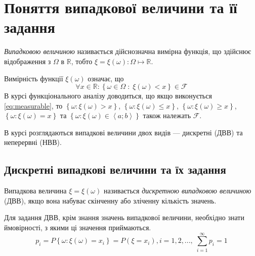 
\section{Поняття випадкової величини та її задання}
\begin{definition}
    \emph{Випадковою величиною} називається дійснозначна вимірна функція, що здійснює 
    відображення з $\Omega$ в $\mathbb{R}$, тобто $\xi = \xi(\omega): \Omega 
    \mapsto \mathbb{R}$.
\end{definition}
\begin{remark}
    Вимірність функції $\xi(\omega)$ означає, що 
    \begin{equation}\label{eq:measurable}
        \forall x \in \mathbb{R}: 
        \left\{ \omega \in \Omega\; :\; \xi(\omega) < x\right\} \in \mathcal{F}
    \end{equation} В курсі 
    функціонального аналізу доводиться, що якщо виконується \eqref{eq:measurable}, то
    $\left\{ \omega: \xi(\omega) > x\right\}$, $\left\{ \omega: \xi(\omega) \leq x\right\}$,
    $\left\{ \omega: \xi(\omega) \geq x\right\}$, $\left\{ \omega: \xi(\omega) = x\right\}$ та
    $\left\{ \omega: \xi(\omega) \in \left< a; b\right> \right\}$ також належать $\mathcal{F}$.
\end{remark}

В курсі розглядаються випадкові величини двох видів --- дискретні (ДВВ) та неперервні (НВВ).

\subsection{Дискретні випадкові величини та їх задання}
\begin{definition}
    Випадкова величина $\xi = \xi(\omega)$ називається 
    \emph{дискретною випадковою величиною} (ДВВ), якщо вона набуває скінченну або зліченну 
    кількість значень.
\end{definition}
Для задання ДВВ, крім знання значень випадкової величини, необхідно знати ймовірності, 
з якими ці значення приймаються.
$$p_i = P\left\{\omega: \xi(\omega) = x_i\right\} = P(\xi = x_i), i = 1,2,... , \; \sum_{i=1}^\infty p_i = 1$$

